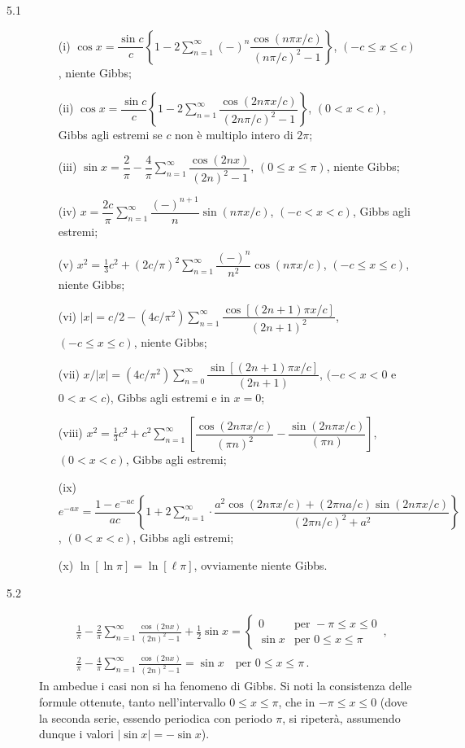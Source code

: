 \documentclass[11pt, a4paper]{book}
\numberwithin{equation}{section}
\begin{document}
\begin{description}
\item[5.1]
\begin{enumerate}
  \item[(i)] $\cos x = \dfrac{\sin c}{c}\left\{1-2\displaystyle\sum_{n=1}^{\infty}(-)^n\dfrac{\cos(n\pi x/c)}{(n\pi/c)^2-1}\right\}$, $(-c\leq x\leq c)$, niente Gibbs;
  \item[(ii)] $\cos x = \dfrac{\sin c}{c}\left\{1-2\displaystyle\sum_{n=1}^{\infty}\dfrac{\cos(2n\pi x/c)}{(2n\pi/c)^2-1}\right\}$, $(0<x<c)$, Gibbs agli estremi se $c$ non è multiplo intero di $2\pi$;
  \item[(iii)] $\sin x = \dfrac{2}{\pi}-\dfrac{4}{\pi}\displaystyle\sum_{n=1}^{\infty}\dfrac{\cos(2nx)}{(2n)^2-1}$, $(0\leq x\leq\pi)$, niente Gibbs;
  \item[(iv)] $x = \dfrac{2c}{\pi}\displaystyle\sum_{n=1}^{\infty}\dfrac{(-)^{n+1}}{n}\sin(n\pi x/c)$, $(-c<x<c)$, Gibbs agli estremi;
  \item[(v)] $x^2 = \tfrac{1}{3}c^2 + (2c/\pi)^2\displaystyle\sum_{n=1}^{\infty}\dfrac{(-)^n}{n^2}\cos(n\pi x/c)$, $(-c\leq x\leq c)$, niente Gibbs;
  \item[(vi)] $|x| = c/2-(4c/\pi^2)\displaystyle\sum_{n=1}^{\infty}\dfrac{\cos[(2n+1)\pi x/c]}{(2n+1)^2}$, $(-c\leq x\leq c)$, niente Gibbs;
  \item[(vii)] $x/|x| = (4c/\pi^2)\displaystyle\sum_{n=0}^{\infty}\dfrac{\sin[(2n+1)\pi x/c]}{(2n+1)}$, $(-c<x<0$ e $0<x<c)$, Gibbs agli estremi e in $x=0$;
  \item[(viii)] $x^2 = \tfrac{1}{3}c^2 + c^2\displaystyle\sum_{n=1}^{\infty}\left[\dfrac{\cos(2n\pi x/c)}{(\pi n)^2}-\dfrac{\sin(2n\pi x/c)}{(\pi n)}\right]$, $(0<x<c)$, Gibbs agli estremi;
  \item[(ix)] $e^{-ax} = \dfrac{1-e^{-ac}}{ac}\left\{1+2\displaystyle\sum_{n=1}^{\infty}\cdot\dfrac{a^2\cos(2n\pi x/c)+(2\pi n a/c)\sin(2n\pi x/c)}{(2\pi n/c)^2+a^2}\right\}$, $(0<x<c)$, Gibbs agli estremi;
  \item[(x)] $\ln[\ln\pi] = \ln[\ell\pi]$, ovviamente niente Gibbs.
\end{enumerate}

\item[5.2]
\begin{align*}
  &\frac{1}{\pi}-\frac{2}{\pi}\sum_{n=1}^{\infty}\frac{\cos(2nx)}{(2n)^2-1}+\frac{1}{2}\sin x
  = \begin{cases} 0 & \text{per } -\pi\leq x\leq 0 \\ \sin x & \text{per } 0\leq x\leq\pi \end{cases}\,,\\
  &\frac{2}{\pi}-\frac{4}{\pi}\sum_{n=1}^{\infty}\frac{\cos(2nx)}{(2n)^2-1} = \sin x\quad\text{per } 0\leq x\leq\pi\,.
\end{align*}
In ambedue i casi non si ha fenomeno di Gibbs. Si noti la consistenza delle formule ottenute, tanto nell'intervallo $0\leq x\leq\pi$, che in $-\pi\leq x\leq 0$ (dove la seconda serie, essendo periodica con periodo $\pi$, si ripeterà, assumendo dunque i valori $|\sin x|=-\sin x$).


\end{description}
\end{document}
